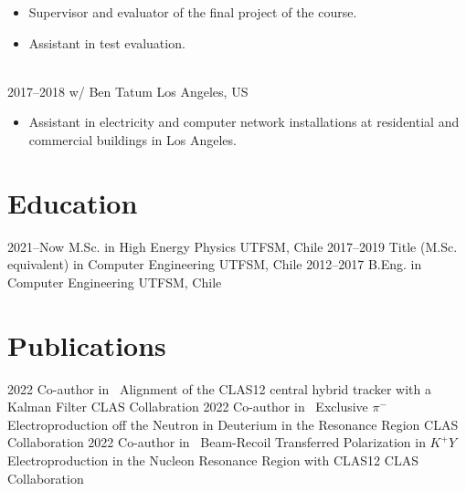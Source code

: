 \documentclass[a4paper]{cv-style}
\begin{document}
\begin{entrylist}
            {
            \begin{itemize}
                \item Supervisor and evaluator of the final project of the course.
                \item Assistant in test evaluation.
            \end{itemize}} \\
        \entry
            {2017--2018}
            {w/ Ben Tatum}
            {Los Angeles, US}
            {
            \begin{itemize}
                \item Assistant in electricity and computer network installations at residential and commercial buildings in Los Angeles.
            \end{itemize}}
    \end{entrylist}

\section{Education}
    \begin{entrylist}
        \entry
            {2021--Now}
            {M.Sc. {\normalfont in High Energy Physics}}
            {UTFSM, Chile}
            {\vspace{-0.3cm}}
        \entry
            {2017--2019}
            {Title (M.Sc. equivalent) {\normalfont in Computer Engineering}}
            {UTFSM, Chile}
            {\vspace{-0.3cm}}
        \entry
            {2012--2017}
            {B.Eng. {\normalfont in Computer Engineering}}
            {UTFSM, Chile}
            {\vspace{-0.3cm}}
    \end{entrylist}

\section{Publications}
    \begin{entrylist}
        \entry
            {2022}
            {{\normalfont Co-author in} ~Alignment of the CLAS12 central hybrid tracker with a Kalman Filter \hspace{1.5cm}}
            {CLAS Collabration}
            {\vspace{-0.3cm}}
        \entry
            {2022}
            {{\normalfont Co-author in} ~Exclusive $\pi^-$ Electroproduction off the Neutron in Deuterium in the Resonance Region}
            {CLAS Collaboration}
            {\vspace{-0.3cm}}
        \entry
            {2022}
            {{\normalfont Co-author in} ~Beam-Recoil Transferred Polarization in $K^+Y$ Electroproduction in the Nucleon Resonance Region with CLAS12}
            {CLAS Collaboration}
            {\vspace{-0.3cm}}
    \end{entrylist}
\end{document}
